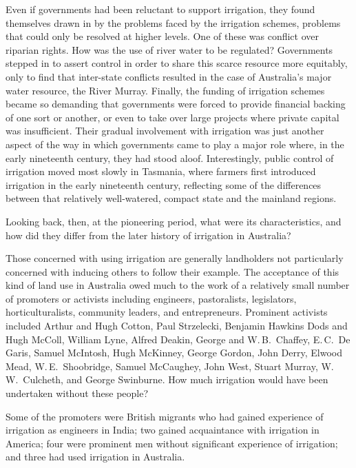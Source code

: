 Even if governments had been reluctant to support irrigation, they
found themselves drawn in by the problems faced by the irrigation
schemes, problems that could only be resolved at higher levels. One of
these was conflict over riparian rights.  How
was the use of river water to be regulated? Governments stepped in to
assert control in order to share this scarce resource more equitably,
only to find that inter-state conflicts resulted in the case of
Australia's major water resource, the River Murray. Finally, the
funding of irrigation schemes became so demanding that governments
were forced to provide financial backing of one sort or
another, or even to take over large projects where private capital was
insufficient. Their gradual involvement with irrigation was just
another aspect of the way in which governments came to play a major
role where, in the early nineteenth century, they had stood
aloof. Interestingly, public control of irrigation moved most slowly
in Tasmania,  where farmers first introduced
irrigation in the early nineteenth century, reflecting some of the
differences between that relatively well-watered, compact state and
the mainland regions.

\bigskip\noindent
Looking back, then, at the pioneering period, what were its
characteristics, and how did they differ from the later history of
irrigation in Australia?

\bigskip\noindent
Those concerned with using irrigation are generally landholders not
particularly concerned with inducing others to follow their
example. The acceptance of this kind of land use in Australia owed
much to the work of a relatively small number of promoters or
activists including engineers, pastoralists, legislators,
horticulturalists, community leaders, and entrepreneurs.  Prominent
activists included Arthur and Hugh Cotton, Paul Strzelecki, Benjamin
Hawkins Dods and Hugh McColl, William Lyne, Alfred Deakin, George and
W.\,B.~Chaffey, E.\,C.~De Garis, Samuel McIntosh, Hugh McKinney,
George Gordon, John Derry, Elwood Mead, W.\,E.~Shoobridge, Samuel
McCaughey, John West, Stuart Murray, W.\,W.~Culcheth, and George
Swinburne. How much irrigation would have been undertaken without
these people?

Some of the promoters were British migrants who had gained experience
of irrigation as engineers in India; two gained
acquaintance with irrigation in America; four were
prominent men without significant experience of irrigation; and three
had used irrigation in Australia.

